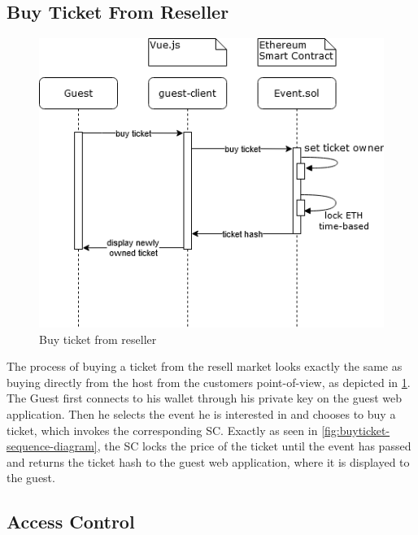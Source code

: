 \subsection{Buy Ticket From Reseller}
\begin{figure}[H]
    \centering
    \includegraphics[width=12cm]{design/diagrams/BuyTicketFromResell.png}
    \caption{Buy ticket from reseller}
    \label{fig:buyFromResell}
\end{figure}
The process of buying a ticket from the resell market looks exactly the same as buying directly from the host from the customers point-of-view, as depicted in \ref{fig:buyFromResell}. The Guest first connects to his wallet through his private key on the guest web application. Then he selects the event he is interested in and chooses to buy a ticket, which invokes the corresponding SC. Exactly as seen in \ref{fig:buyticket-sequence-diagram}, the SC locks the price of the ticket until the event has passed and returns the ticket hash to the guest web application, where it is displayed to the guest.

\subsection{Access Control}\label{subsection:access-control}

